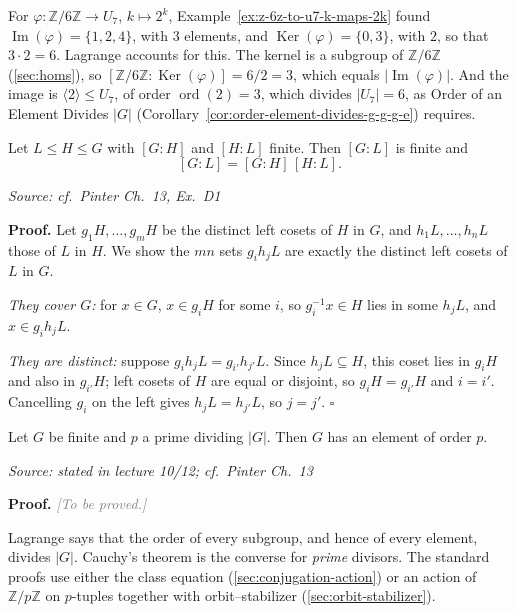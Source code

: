 \documentclass[11pt]{report}
\renewenvironment{proof}[1][Proof]{\noindent\textbf{#1.} }{\hfill$\square$\par\vspace{5pt}}
\newcommand{\proofpending}{\noindent\textbf{Proof.} \textcolor{gray}{\textit{[To be proved.]}}\par\vspace{5pt}}
\newcommand{\srcline}[1]{\par\hfill{\footnotesize\textit{Source: #1}}}
\begin{document}
\begin{exbox}\label{ex:lagrange-pattern-z6-to-u7}
For $\varphi: \mathbb{Z}/6\mathbb{Z} \to U_7$, $k \mapsto 2^k$, Example~\ref{ex:z-6z-to-u7-k-maps-2k} found $\operatorname{Im}(\varphi) = \{1, 2, 4\}$, with $3$ elements, and $\operatorname{Ker}(\varphi) = \{0, 3\}$, with $2$, so that $3 \cdot 2 = 6$. Lagrange accounts for this. The kernel is a subgroup of $\mathbb{Z}/6\mathbb{Z}$ (\ref{sec:homs}), so $[\mathbb{Z}/6\mathbb{Z} : \operatorname{Ker}(\varphi)] = 6/2 = 3$, which equals $|\operatorname{Im}(\varphi)|$. And the image is $\langle 2 \rangle \leq U_7$, of order $\operatorname{ord}(2) = 3$, which divides $|U_7| = 6$, as Order of an Element Divides $|G|$ (Corollary~\ref{cor:order-element-divides-g-g-g-e}) requires.
\end{exbox}


\begin{propbox}\label{prop:index-multiplicative}
Let $L \leq H \leq G$ with $[G : H]$ and $[H : L]$ finite. Then $[G : L]$ is finite and
\[ [G : L] = [G : H]\,[H : L]. \]
\srcline{cf.\ Pinter Ch.\ 13, Ex.\ D1}
\end{propbox}

\begin{proof}
Let $g_1H, \ldots, g_mH$ be the distinct left cosets of $H$ in $G$, and $h_1L, \ldots, h_nL$ those of $L$ in $H$. We show the $mn$ sets $g_ih_jL$ are exactly the distinct left cosets of $L$ in $G$.

\emph{They cover $G$:} for $x \in G$, $x \in g_iH$ for some $i$, so $g_i^{-1}x \in H$ lies in some $h_jL$, and $x \in g_ih_jL$.

\emph{They are distinct:} suppose $g_ih_jL = g_{i'}h_{j'}L$. Since $h_jL \subseteq H$, this coset lies in $g_iH$ and also in $g_{i'}H$; left cosets of $H$ are equal or disjoint, so $g_iH = g_{i'}H$ and $i = i'$. Cancelling $g_i$ on the left gives $h_jL = h_{j'}L$, so $j = j'$.
\end{proof}

\begin{thmbox}\label{thm:cauchys-theorem}
Let $G$ be finite and $p$ a prime dividing $|G|$. Then $G$ has an element of order $p$.
\srcline{stated in lecture 10/12; cf.\ Pinter Ch.\ 13}
\end{thmbox}

\proofpending

\begin{rembox}\label{rem:partial-converse-lagrange}
Lagrange says that the order of every subgroup, and hence of every element, divides $|G|$. Cauchy's theorem is the converse for \emph{prime} divisors. The standard proofs use either the class equation (\ref{sec:conjugation-action}) or an action of $\mathbb{Z}/p\mathbb{Z}$ on $p$-tuples together with orbit--stabilizer (\ref{sec:orbit-stabilizer}).
\end{rembox}
\end{document}
